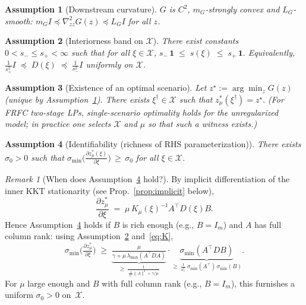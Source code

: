 \documentclass[11pt]{article}
\newtheorem{assumption}{Assumption}
\theoremstyle{remark}
\newtheorem{remark}{Remark}
\begin{document}
\begin{assumption}[Downstream curvature]
\label{ass:Gsc}
$G$ is $C^2$, $m_G$-strongly convex and $L_G$-smooth:
\(
m_G I \preceq \nabla^2_{zz} G(z) \preceq L_G I
\) for all $z$.
\end{assumption}

\begin{assumption}[Interiorness band on $\mathcal{X}$]
\label{ass:interior}
There exist constants $0<s_- \le s_+ < \infty$ such that for all $\xi\in\mathcal{X}$,
\(
s_- \,\bm{1} \;\le\; s(\xi) \;\le\; s_+ \,\bm{1}.
\)
Equivalently,
\(
\frac{1}{s_+^2} I \;\preceq\; D(\xi) \;\preceq\; \frac{1}{s_-^2} I
\)
uniformly on $\mathcal{X}$.
\end{assumption}

\begin{assumption}[Existence of an optimal scenario]
\label{ass:exist}
Let $z^\star:=\arg\min_z G(z)$ (unique by Assumption~\ref{ass:Gsc}). There exists $\xi^\dagger\in\mathcal{X}$ such that
\(
z^*_\mu(\xi^\dagger)=z^\star .
\)
(For FRFC two-stage LPs, single-scenario optimality holds for the unregularized model; in practice one selects $\mathcal{X}$ and $\mu$ so that such a witness exists.)
\end{assumption}

\begin{assumption}[Identifiability (richness of RHS parameterization)]
\label{ass:ident}
There exists $\sigma_0>0$ such that
\(
\sigma_{\min}\!\Big(\frac{\partial z^*_\mu(\xi)}{\partial \xi}\Big) \,\ge\, \sigma_0
\)
for all $\xi\in\mathcal{X}$.
\end{assumption}

\begin{remark}[When does Assumption~\ref{ass:ident} hold?]
By implicit differentiation of the inner KKT stationarity (see Prop.~\ref{prop:implicit} below),
\[
\frac{\partial z^*_\mu}{\partial \xi}
\;=\;
\mu\,K_\mu(\xi)^{-1} A^\top D(\xi) B.
\]
Hence Assumption~\ref{ass:ident} holds if $B$ is rich enough (e.g., $B=I_m$) and $A$ has full column rank: using Assumption~\ref{ass:interior} and~\eqref{eq:K},
\[
\sigma_{\min}\!\Big(\tfrac{\partial z^*_\mu}{\partial \xi}\Big)
\;\ge\;
\underbrace{\tfrac{\mu}{\gamma+\mu\,\lambda_{\max}(A^\top D A)}}_{\ge\ \frac{1}{\,\frac{1}{s_-^2}\|A\|^2+\gamma/\mu\,}}
\cdot
\underbrace{\sigma_{\min}(A^\top D B)}_{\ge\ \frac{1}{s_+^2}\,\sigma_{\min}(A^\top)\,\sigma_{\min}(B)} .
\]
For $\mu$ large enough and $B$ with full column rank (e.g., $B=I_m$), this furnishes a uniform $\sigma_0>0$ on~$\mathcal{X}$.
\end{remark}
\end{document}
